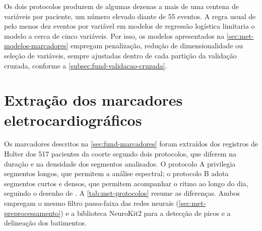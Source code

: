 Os dois protocolos produzem de algumas dezenas a mais de uma centena de
variáveis por paciente, um número elevado diante de 55 eventos. A regra
usual de pelo menos dez eventos por variável em modelos de regressão
logística \cite{peduzzi1996simulation} limitaria o modelo a cerca de cinco
variáveis. Por isso, os modelos apresentados na
\autoref{sec:met-modelos-marcadores} empregam penalização, redução de
dimensionalidade ou seleção de variáveis, sempre ajustadas dentro de cada
partição da validação cruzada, conforme a
\autoref{subsec:fund-validacao-cruzada}.




%
%

\section{Extração dos marcadores eletrocardiográficos}
\label{sec:met-extracao}

Os marcadores descritos na \autoref{sec:fund-marcadores} foram extraídos dos
registros de Holter dos 517 pacientes da coorte segundo dois protocolos,
que diferem na duração e na densidade dos segmentos analisados. O protocolo
A privilegia segmentos longos, que permitem a análise espectral; o protocolo
B adota segmentos curtos e densos, que permitem acompanhar o ritmo ao longo
do dia, seguindo o desenho de . A
\autoref{tab:met-protocolos} resume as diferenças. Ambos empregam o mesmo
filtro passa-faixa das redes neurais (\autoref{sec:met-preprocessamento}) e
a biblioteca NeuroKit2 \cite{makowski2021neurokit2} para a detecção de picos
e a delineação dos batimentos.


